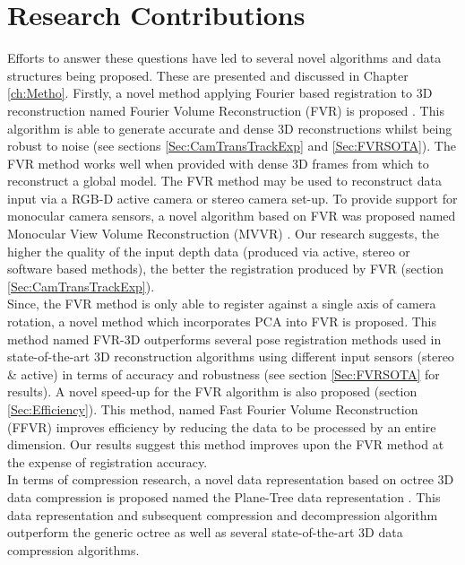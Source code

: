 \section{Research Contributions}
\label{sec:INTO_RESEARCH_CONTRIBUTIONS}
Efforts to answer these questions have led to several novel algorithms and data structures being proposed. These are presented and discussed in Chapter \ref{ch:Metho}. Firstly, a novel method applying Fourier based registration to 3D reconstruction named Fourier Volume Reconstruction (FVR) is proposed \cite{Lincoln16Fourier,Lincoln16Dense}. This algorithm is able to generate accurate and dense 3D reconstructions whilst being robust to noise (see sections \ref{Sec:CamTransTrackExp} and \ref{Sec:FVRSOTA}). The FVR method works well when provided with dense 3D frames from which to reconstruct a global model. The FVR method may be used to reconstruct data input via a RGB-D active camera or stereo camera set-up. To provide support for monocular camera sensors, a novel algorithm based on FVR was proposed named Monocular View Volume Reconstruction (MVVR) \cite{Lincoln16Monocular}. Our research suggests, the higher the quality of the input depth data (produced via active, stereo or software based methods), the better the registration produced by FVR (section \ref{Sec:CamTransTrackExp}). \\

Since, the FVR method is only able to register against a single axis of camera rotation, a novel method which incorporates PCA into FVR is proposed. This method named FVR-3D outperforms several pose registration methods used in state-of-the-art 3D reconstruction algorithms using different input sensors (stereo \& active) in terms of accuracy and robustness (see section \ref{Sec:FVRSOTA} for results). A novel speed-up for the FVR algorithm is also proposed (section \ref{Sec:Efficiency}). This method, named Fast Fourier Volume Reconstruction (FFVR) improves efficiency by reducing the data to be processed by an entire dimension. Our results suggest this method improves upon the FVR method at the expense of registration accuracy. \\

In terms of compression research, a novel data representation based on octree 3D data compression is proposed named the Plane-Tree data representation \cite{Lincoln15Plane}. This data representation and subsequent compression and decompression algorithm outperform the generic octree as well as several state-of-the-art 3D data compression algorithms. \\

